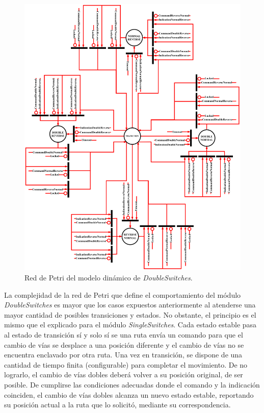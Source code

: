 	\begin{figure}[H]
		\centering
		\includegraphics[width=1\textwidth]{Figuras/DSW_petri}
		\centering\caption{Red de Petri del modelo dinámico de \textit{DoubleSwitches}.}
		\label{fig:DSW_Petri}
	\end{figure}
	
	La complejidad de la red de Petri que define el comportamiento del módulo \textit{DoubleSwitches} es mayor que los casos expuestos anteriormente al atenderse una mayor cantidad de posibles transiciones y estados. No obstante, el principio es el mismo que el explicado para el módulo \textit{SingleSwitches}. Cada estado estable pasa al estado de transición sí y solo sí se una ruta envía un comando para que el cambio de vías se desplace a una posición diferente y el cambio de vías no se encuentra enclavado por otra ruta. Una vez en transición, se dispone de una cantidad de tiempo finita (configurable) para completar el movimiento. De no lograrlo, el cambio de vías dobles deberá volver a su posición original, de ser posible. De cumplirse las condiciones adecuadas donde el comando y la indicación coinciden, el cambio de vías dobles alcanza un nuevo estado estable, reportando su posición actual a la ruta que lo solicitó, mediante su correspondencia.
